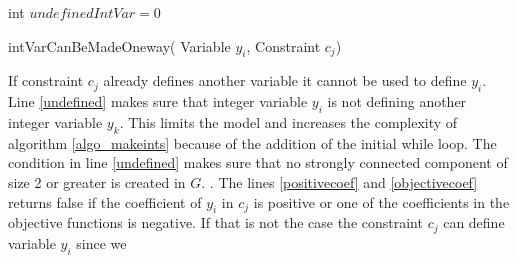 \begin{algorithm}[H]

\algdata
{}
\BlankLine
{}

int $undefinedIntVar = 0$ \;
\Return{} \true\;
 \caption{intVarCanBeMadeOneway( \textsf{Variable} $y_i$, \textsf{Constraint} $c_j$)} \label{algo_checkintoneway}
\end{algorithm}
\DecMargin{1em}
If constraint $c_j$ already defines another variable it cannot be used to define $y_i$. Line \ref{undefined} makes sure 
that integer variable $y_i$ is not defining another integer variable $y_k$. This limits the model and increases the 
complexity of algorithm \ref{algo_makeints} because of the addition of the initial while loop. The 
condition in line \ref{undefined} makes sure that no strongly connected component of size 2 or greater is created in 
$G$. . The lines \ref{positivecoef} and 
\ref{objectivecoef} returns false if the coefficient of $y_i$ in $c_j$ is positive or one of the coefficients in the 
objective functions is negative. If that is not the case the constraint $c_j$ can define variable $y_i$ since we 
